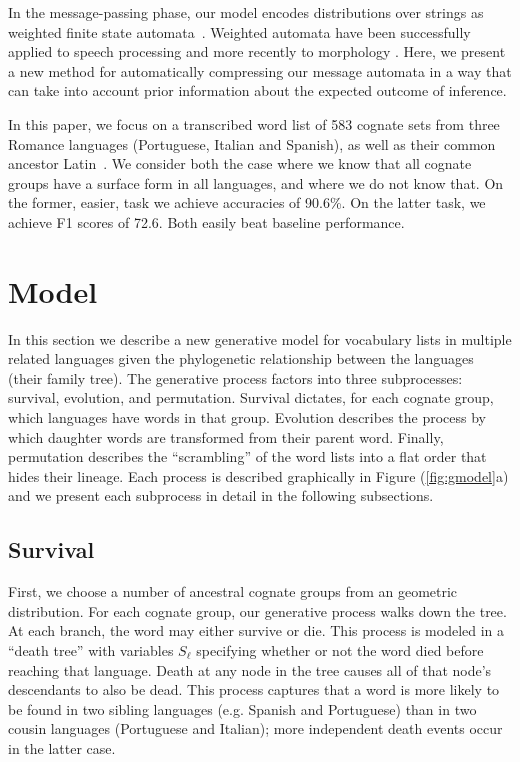 \documentclass[11pt,a4paper]{article}
\begin{document}
In the message-passing phase, our model encodes distributions over
strings as weighted finite state automata~\cite{mohri09weighted}.
Weighted automata have been successfully applied to speech processing
\cite{Mohri96weightedautomata} and more recently to morphology
\cite{dreyer2009graphical}.  Here, we present a new method for
automatically compressing our message automata in a way that can
take into account prior information about the expected outcome of
inference.

In this paper, we focus on a transcribed word list of 583 cognate
sets from three Romance languages (Portuguese, Italian and Spanish),
as well as their common ancestor Latin~\cite{bouchard07probabilistic}.
We consider both the case where we know that all cognate groups
have a surface form in all languages, and where we do not know that.
On the former, easier, task we achieve accuracies of 90.6\%. On the
latter task, we achieve F1 scores of 72.6. Both easily beat baseline
performance.

\section{Model}

In this section we describe a new generative model for vocabulary
lists in multiple related languages given the phylogenetic relationship
between the languages (their family tree). The generative process
factors into three subprocesses: survival, evolution, and permutation.
Survival dictates, for each cognate group, which languages have
words in that group. Evolution describes the process by which
daughter words are transformed from their parent word. Finally,
permutation describes the ``scrambling'' of the word lists into a
flat order that hides their lineage. Each process is described
graphically in Figure (\ref{fig:gmodel}a) and we present each
subprocess in detail in the following subsections.

\subsection{Survival}

First, we choose a number of ancestral cognate groups from an
geometric distribution.  For each cognate group, our generative
process walks down the tree.  At each branch, the word may either
survive or die.  This process is modeled in a ``death tree'' with
variables $S_\ell$ specifying whether or not the word died before
reaching that language. Death at any node in the tree causes all
of that node's descendants to also be dead.  This process captures
that a word is more likely to be found in two sibling languages
(e.g. Spanish and Portuguese) than in two cousin languages (Portuguese
and Italian); more independent death events occur in the latter
case.
\end{document}
